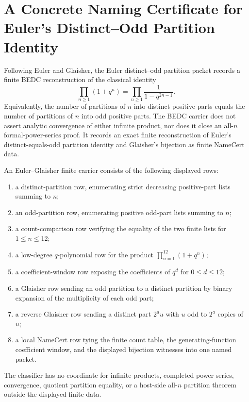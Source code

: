 \chapter{A Concrete Naming Certificate for Euler's Distinct--Odd Partition Identity}
\label{ch:concrete-instances-euler-distinct-odd-partition-namecert}

Following Euler and Glaisher, the Euler distinct--odd partition packet records a finite BEDC reconstruction of the classical identity
$$
\prod_{n\geq 1}(1+q^n)=\prod_{n\geq 1}\frac{1}{1-q^{2n-1}}.
$$
Equivalently, the number of partitions of $n$ into distinct positive parts equals the number of partitions of $n$ into odd positive parts. The BEDC carrier does not assert analytic convergence of either infinite product, nor does it close an all-$n$ formal-power-series proof. It records an exact finite reconstruction of Euler's distinct-equals-odd partition identity and Glaisher's bijection as finite NameCert data.

\begin{definition}
\label{def:euler-distinct-odd-partition-finite-carrier}
An Euler--Glaisher finite carrier consists of the following displayed rows:
\begin{enumerate}
\item a distinct-partition row, enumerating strict decreasing positive-part lists summing to $n$;
\item an odd-partition row, enumerating positive odd-part lists summing to $n$;
\item a count-comparison row verifying the equality of the two finite lists for $1\leq n\leq 12$;
\item a low-degree $q$-polynomial row for the product $\prod_{n=1}^{12}(1+q^n)$;
\item a coefficient-window row exposing the coefficients of $q^d$ for $0\leq d\leq 12$;
\item a Glaisher row sending an odd partition to a distinct partition by binary expansion of the multiplicity of each odd part;
\item a reverse Glaisher row sending a distinct part $2^a u$ with $u$ odd to $2^a$ copies of $u$;
\item a local NameCert row tying the finite count table, the generating-function coefficient window, and the displayed bijection witnesses into one named packet.
\end{enumerate}
The classifier has no coordinate for infinite products, completed power series, convergence, quotient partition equality, or a host-side all-$n$ partition theorem outside the displayed finite data.
\end{definition}

